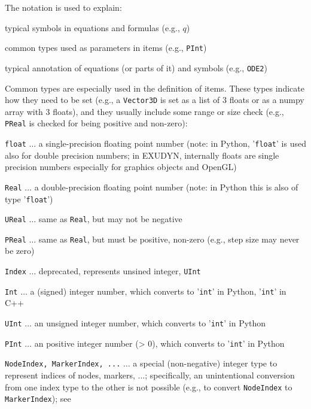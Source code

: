 %
The notation is used to explain:
\bi
  \item typical symbols in equations and formulas (e.g., $q$)
  \item common types used as parameters in items (e.g., \texttt{PInt})
  \item typical annotation of equations (or parts of it) and symbols (e.g., \texttt{ODE2})
\ei

%
Common types are especially used in the definition of items. 
These types indicate how they need to be set (e.g., a \texttt{Vector3D} is set as a list of 3 floats or as a numpy array with 3 floats), 
and they usually include some range or size check (e.g., \texttt{PReal} is checked for being positive and non-zero):
\bi
  \item \texttt{float} $\ldots$ a single-precision floating point number (note: in Python, '\texttt{float}' is used also for double precision numbers; in EXUDYN, internally floats are single precision numbers especially for graphics objects and OpenGL)
  \item \texttt{Real} $\ldots$ a double-precision floating point number (note: in Python this is also of type '\texttt{float}')
  \item \texttt{UReal} $\ldots$ same as \texttt{Real}, but may not be negative
  \item \texttt{PReal} $\ldots$ same as \texttt{Real}, but must be positive, non-zero (e.g., step size may never be zero)
  \item \texttt{Index} $\ldots$ deprecated, represents unsined integer, \texttt{UInt}
  \item \texttt{Int} $\ldots$ a (signed) integer number, which converts to '\texttt{int}' in Python, '\texttt{int}' in C++
  \item \texttt{UInt} $\ldots$ an unsigned integer number, which converts to '\texttt{int}' in Python
  \item \texttt{PInt} $\ldots$ an positive integer number (> 0), which converts to '\texttt{int}' in Python
%
  \item \texttt{NodeIndex, MarkerIndex, ...} $\ldots$ a special (non-negative) integer type to represent indices of nodes, markers, ...; specifically, an unintentional conversion from one index type to the other is not possible (e.g., to convert \texttt{NodeIndex} to \texttt{MarkerIndex}); see 
